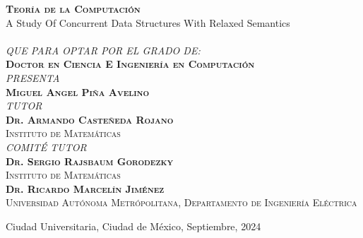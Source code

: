 {\begin{changemargin}{-1cm}{-1.5cm}
{\begin{minipage}[c][0.76\textheight][t]{\textwidth}
\begin{center}
        \textbf{\large{\textsc{Teoría de la Computación}}}\\
        \vspace{0.7cm}
        {\Large A Study Of Concurrent Data Structures With Relaxed Semantics}\\
        \vspace{0.7cm}
          \\\vspace{7mm}
        \textit{\large QUE PARA OPTAR POR EL GRADO DE:}\\\vspace{3mm}
        \textbf{\Large{\textsc{Doctor en Ciencia E Ingeniería en Computación}}}\\[15pt]
        \textit{PRESENTA}\\[4pt]
        \textbf{\Large{\textsc{Miguel Angel Piña Avelino}}}\\
        \vspace{0.5cm}
        \textit{\normalsize{TUTOR}}\\[4pt]
        \textbf{\Large{\textsc{Dr. Armando Casteñeda Rojano}}}\\
        \normalsize{\textsc{Instituto de Matemáticas}}\\
        \vspace{0.5cm}
        \textit{\normalsize{COMITÉ TUTOR}}\\[4pt]
        \textbf{\Large{\textsc{Dr. Sergio Rajsbaum Gorodezky}}}\\
        \normalsize{\textsc{Instituto de Matemáticas}}\\
        \vspace{3mm}
        \textbf{\Large{\textsc{Dr. Ricardo Marcelín Jiménez}}}\\
        \normalsize{\textsc{Universidad Autónoma Metrópolitana, Departamento de Ingeniería Eléctrica}}\\
        \vspace{2cm}
        \begin{flushright}
          \small{{Ciudad Universitaria, Ciudad de México,}{ }{Septiembre, 2024}}
        \end{flushright}
      \end{center}
    \end{minipage}
  }

\end{changemargin}
\restoregeometry{}
\clearpage


}
